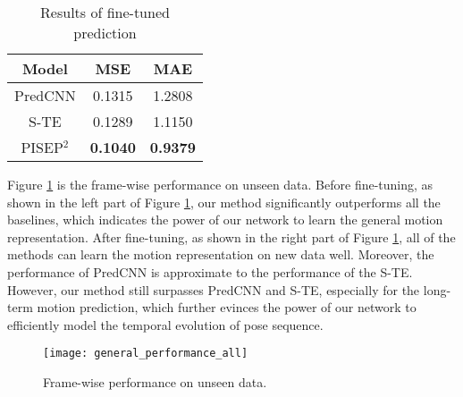 \documentclass[journal]{IEEEtran}
\begin{document}
\begin{table}[!t]
\renewcommand{\arraystretch}{1.3}
\caption{Results of fine-tuned prediction}
\label{table6}
\centering
\begin{tabular}{ccc}
\hline
Model&MSE&MAE \\
\hline
PredCNN\cite{predcnn}&0.1315&1.2808 \\
S-TE\cite{ButepageDRL}&0.1289&1.1150 \\
PISEP${^2}$ &{\bf 0.1040}&{\bf 0.9379} \\
\hline
\end{tabular}
\end{table}

Figure \ref{fig12} is the frame-wise performance on unseen data. Before fine-tuning, as shown in the left part of  Figure \ref{fig12}, our method significantly outperforms all the baselines, which indicates the power of our network to learn the general motion representation. After fine-tuning, as shown in the right part of Figure \ref{fig12}, all of the methods can learn the motion representation on new data well. Moreover, the performance of PredCNN is approximate to the performance of the S-TE. However, our method still surpasses PredCNN and S-TE, especially for the long-term motion prediction, which further evinces the power of our network to efficiently model the temporal evolution of pose sequence.

\begin{figure}[!t]
\centering
\texttt{[image: general\_performance\_all]}
\caption{Frame-wise performance on unseen data.}
\label{fig12}
\end{figure}
\end{document}
